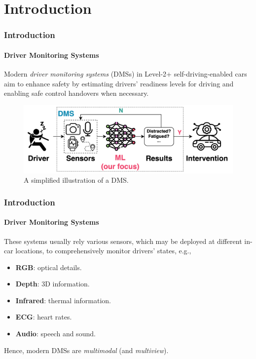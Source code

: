 \section{Introduction}

\begin{frame}
\frametitle{Introduction}
\framesubtitle{Driver Monitoring Systems}

Modern \textit{driver monitoring systems} (DMSs) in Level-2+ self-driving-enabled cars aim to enhance safety by estimating drivers' readiness levels for driving and enabling safe control handovers when necessary.

\begin{figure}[hb]
    \centering
    \includegraphics[width=0.9\linewidth]{images/dms.png}
    \caption{A simplified illustration of a DMS.}
    \label{fig:1}
\end{figure}
\end{frame}

\begin{frame}
\frametitle{Introduction}
\framesubtitle{Driver Monitoring Systems}

These systems usually rely various sensors, which may be deployed at different in-car locations, to comprehensively monitor drivers' states, e.g.,

\begin{itemize}
    \item \textbf{RGB}: optical details.
    \item \textbf{Depth}: 3D information.
    \item \textbf{Infrared}: thermal information.
    \item \textbf{ECG}: heart rates.
    \item \textbf{Audio}: speech and sound.
\end{itemize}

Hence, modern DMSs are \textit{multimodal} (and \textit{multiview}).
\end{frame}

